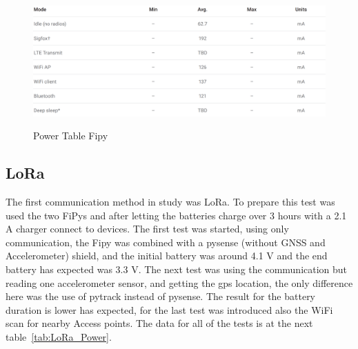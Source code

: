 \begin{figure}[htbp]
  \centering
  
    {\includegraphics[width=\linewidth]{Chapters/Figures/power1.PNG}}%
 
  \caption{Power Table Fipy~\cite{Microcontroller2017}}
  \label{fig:PowerTableAll}
\end{figure}


\subsection{LoRa}
\label{subsec:LoRa}

The first communication method in study was LoRa. To prepare this test was used the two FiPys and after letting the batteries charge over 3 hours with a 2.1 A charger connect to devices. The first test was started, using only communication, the Fipy was combined with a pysense (without GNSS and Accelerometer)  shield, and the initial battery was around 4.1 V and the end battery has expected was 3.3 V. The next test was using the communication but reading one accelerometer sensor, and getting the gps location, the only difference here was the use of pytrack instead of pysense. The result for the battery duration is lower has expected, for the last test was introduced also the WiFi scan for nearby Access points. The data for all of the tests is at the next table~\ref{tab:LoRa_Power}. 

